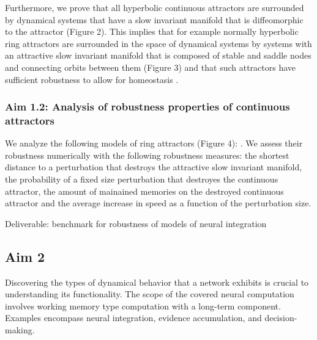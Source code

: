 \documentclass[12pt,letterpaper, onecolumn]{article}
\theoremstyle{definition}
\theoremstyle{remark}
\begin{document}
Furthermore, we prove that all hyperbolic continuous attractors are surrounded by dynamical systems that have a slow invariant manifold that is diffeomorphic to the attractor (Figure 2). %
This implies that for example normally hyperbolic ring attractors are surrounded in the space of dynamical systems by systems with an attractive slow invariant manifold that is composed of stable and saddle nodes and connecting orbits between them (Figure 3) and that such attractors have sufficient robustness to allow for homeostasis \citep{oleary2018homeostasis, niemeyer2021, kozachkov2022a, seeholzer2019}.



\subsubsection*{Aim 1.2: Analysis of robustness properties of continuous attractors}
 We analyze the following models of ring attractors (Figure 4): \citep{pollock2020, barak2021mapping, beiran2021, noorman2022}.
We assess their robustness numerically with the following robustness measures:
the shortest distance to a perturbation that destroys the attractive slow invariant manifold,
the probability of a fixed size perturbation that destroyes the continuous attractor,
the amount of mainained memories on the destroyed continuous attractor and
the average increase in speed as a function of the perturbation size.





Deliverable: benchmark for robustness of models of neural integration





\newpage

\subsection*{Aim 2}
Discovering the types of dynamical behavior that a network exhibits is crucial to understanding its functionality. The scope of the covered neural computation involves working memory type computation with a long-term component. Examples encompass neural integration, evidence accumulation, and decision-making.
\end{document}
